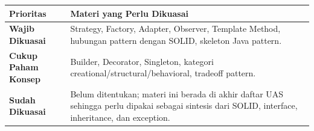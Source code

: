 \begin{tabularx}{\textwidth}{|L{0.22\textwidth}|X|}
\hline
\textbf{Prioritas} & \textbf{Materi yang Perlu Dikuasai} \\
\hline
\textbf{Wajib Dikuasai} & Strategy, Factory, Adapter, Observer, Template Method, hubungan pattern dengan SOLID, skeleton Java pattern. \\
\hline
\textbf{Cukup Paham Konsep} & Builder, Decorator, Singleton, kategori creational/structural/behavioral, tradeoff pattern. \\
\hline
\textbf{Sudah Dikuasai} & Belum ditentukan; materi ini berada di akhir daftar UAS sehingga perlu dipakai sebagai sintesis dari SOLID, interface, inheritance, dan exception. \\
\hline
\end{tabularx}

